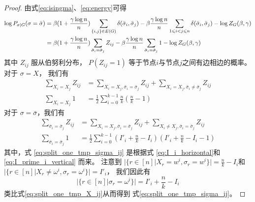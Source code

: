 \begin{proof}
  由式\eqref{eq:isingma}、\eqref{eq:energy}可得
	\begin{align}
  \log P_{\sigma|G}(\sigma=\bar{\sigma})
  & = 
  \beta(1 + \frac{\gamma \log n}{n}) \sum_{\{i,j\} \in E(G)}  \delta(\bar{\sigma}_i, \bar{\sigma}_j)  
	- \beta\frac{\gamma \log n}{n} \sum_{1\leq i<j \leq n} \delta(\bar{\sigma}_i, \bar{\sigma}_j)  - \log Z_G(\beta, \gamma)
  \notag\\
  & = 
  \beta(1 + \frac{\gamma \log n}{n}) \sum_{\bar{\sigma}_i = \bar{\sigma}_j} Z_{ij}
	- \beta\frac{\gamma \log n}{n}
  \sum_{\bar{\sigma}_i = \bar{\sigma}_j} 1 
  - \log Z_G(\beta, \gamma)
  \label{eq:log_P_sigma_G_bar_sigma}
  \end{align}
	其中 $Z_{ij}$ 服从伯努利分布，
  $P(Z_{ij}=1)$ 等于节点$i$与节点$j$之间有边相边的概率。
	对于 $\sigma = X$， 我们有
	\begin{align}
	\sum_{X_i = X_j} Z_{ij} &
  = \sum_{X_i = X_j, \bar{\sigma}_i = \bar{\sigma}_j}
  Z_{ij} + \sum_{X_i = X_j, \bar{\sigma}_i \neq \bar{\sigma}_j}
  Z_{ij}
  \label{eq:split_zij_tmp_X_ij}\\
	\sum_{X_i = X_j} 1 &= \frac{1}{2} \sum_{i=0}^{k-1} \frac{n}{k} 
  \left( \frac{n}{k} - 1 
  \right)\label{eq:split_one_tmp_X_ij}
	\end{align}
	对于 $\sigma = \bar{\sigma}$，我们有
	\begin{align}
	\sum_{\bar{\sigma}_i = \bar{\sigma}_j} Z_{ij} &= \sum_{X_i = X_j, \bar{\sigma}_i = \bar{\sigma}_j} Z_{ij} + \sum_{X_i \neq X_j, \bar{\sigma}_i = \bar{\sigma}_j} Z_{ij} 
  \label{eq:split_zij_tmp_sigma_ij}\\
	\sum_{\bar{\sigma}_i = \bar{\sigma}_j} 1 &= \frac{1}{2} \sum_{i=0}^{k-1} (I'_i + \frac{n}{k} - I_i) ( I'_i + \frac{n}{k} - I_i - 1)
  \label{eq:split_one_tmp_sigma_ij}
	\end{align}
  其中，式 \eqref{eq:split_one_tmp_sigma_ij} 是根据式
  \eqref{eq:I_i_horizontal}和 \eqref{eq:I_prime_i_vertical}
  而来。
	注意到
  $
  \Big|\{r\in [n] \big| X_r = w^i, \sigma_r=w^i \}\Big|
  =\frac{n}{k} - I_i$和
	$|\{r\in [n] | X_r \neq \omega^i, \sigma_r = \omega^i \}| = I'_i$，
	我们因此有  
  \begin{equation}\label{eq:number_of_sigma_r_equal_omega_i}
    |\{r\in [n] | \sigma_r = \omega^i \}|
    = I'_i + \frac{n}{k} - I_i
  \end{equation}
  类比式\eqref{eq:split_one_tmp_X_ij}从而得到
  式\eqref{eq:split_one_tmp_sigma_ij}。


\end{proof}
